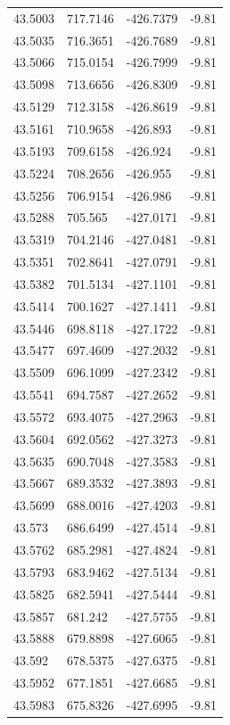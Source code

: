 \begin{table}[H]
\begin{tabular}{llll}
43.5003 & 717.7146 & -426.7379 & -9.81 \\
43.5035 & 716.3651 & -426.7689 & -9.81 \\
43.5066 & 715.0154 & -426.7999 & -9.81 \\
43.5098 & 713.6656 & -426.8309 & -9.81 \\
43.5129 & 712.3158 & -426.8619 & -9.81 \\
43.5161 & 710.9658 & -426.893 & -9.81 \\
43.5193 & 709.6158 & -426.924 & -9.81 \\
43.5224 & 708.2656 & -426.955 & -9.81 \\
43.5256 & 706.9154 & -426.986 & -9.81 \\
43.5288 & 705.565 & -427.0171 & -9.81 \\
43.5319 & 704.2146 & -427.0481 & -9.81 \\
43.5351 & 702.8641 & -427.0791 & -9.81 \\
43.5382 & 701.5134 & -427.1101 & -9.81 \\
43.5414 & 700.1627 & -427.1411 & -9.81 \\
43.5446 & 698.8118 & -427.1722 & -9.81 \\
43.5477 & 697.4609 & -427.2032 & -9.81 \\
43.5509 & 696.1099 & -427.2342 & -9.81 \\
43.5541 & 694.7587 & -427.2652 & -9.81 \\
43.5572 & 693.4075 & -427.2963 & -9.81 \\
43.5604 & 692.0562 & -427.3273 & -9.81 \\
43.5635 & 690.7048 & -427.3583 & -9.81 \\
43.5667 & 689.3532 & -427.3893 & -9.81 \\
43.5699 & 688.0016 & -427.4203 & -9.81 \\
43.573 & 686.6499 & -427.4514 & -9.81 \\
43.5762 & 685.2981 & -427.4824 & -9.81 \\
43.5793 & 683.9462 & -427.5134 & -9.81 \\
43.5825 & 682.5941 & -427.5444 & -9.81 \\
43.5857 & 681.242 & -427.5755 & -9.81 \\
43.5888 & 679.8898 & -427.6065 & -9.81 \\
43.592 & 678.5375 & -427.6375 & -9.81 \\
43.5952 & 677.1851 & -427.6685 & -9.81 \\
43.5983 & 675.8326 & -427.6995 & -9.81 \\

\end{tabular}
\end{table}
